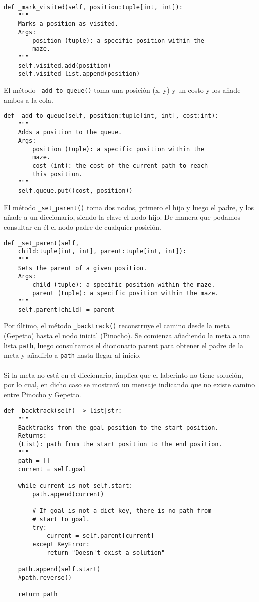 \begin{lstlisting}
def _mark_visited(self, position:tuple[int, int]):
    """
    Marks a position as visited.
    Args:
        position (tuple): a specific position within the
        maze.
    """
    self.visited.add(position)
    self.visited_list.append(position)
\end{lstlisting}
\clearpage
El método \lstinline{_add_to_queue()} toma una posición (x, y) y un costo y los añade ambos a la cola.\\
\begin{lstlisting}
def _add_to_queue(self, position:tuple[int, int], cost:int):
    """
    Adds a position to the queue.
    Args:
        position (tuple): a specific position within the
        maze.
        cost (int): the cost of the current path to reach
        this position.
    """
    self.queue.put((cost, position))
\end{lstlisting}
El método \lstinline{_set_parent()} toma dos nodos, primero el hijo y luego el padre, y los añade a un diccionario, siendo la clave el nodo hijo. De manera que podamos consultar en él el nodo padre de cualquier posición.\\
\begin{lstlisting}
def _set_parent(self,
    child:tuple[int, int], parent:tuple[int, int]):
    """
    Sets the parent of a given position.
    Args:
        child (tuple): a specific position within the maze.
        parent (tuple): a specific position within the maze.
    """
    self.parent[child] = parent
\end{lstlisting}
\clearpage
Por último, el método \lstinline{_backtrack()} reconstruye el camino desde la meta (Gepetto) hasta el nodo inicial (Pinocho). Se comienza añadiendo la meta a una lista \lstinline{path}, luego consultamos el diccionario parent para obtener el padre de la meta y añadirlo a \lstinline{path} hasta llegar al inicio.
\\\\
Si la meta no está en el diccionario, implica que el laberinto no tiene solución, por lo cual, en dicho caso se mostrará un mensaje indicando que no existe camino entre Pinocho y Gepetto.\\
\begin{lstlisting}
def _backtrack(self) -> list|str:
    """
    Backtracks from the goal position to the start position.
    Returns:
    (List): path from the start position to the end position.
    """
    path = []
    current = self.goal

    while current is not self.start:
        path.append(current)

        # If goal is not a dict key, there is no path from
        # start to goal.
        try:
            current = self.parent[current]
        except KeyError:
            return "Doesn't exist a solution"

    path.append(self.start)
    #path.reverse()

    return path

\end{lstlisting}

\clearpage